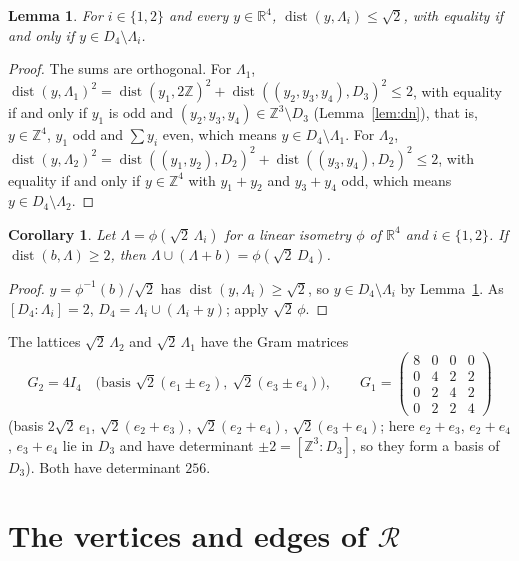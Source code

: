 \documentclass[11pt]{amsart}
\newtheorem{lemma}[theorem]{Lemma}
\newtheorem{corollary}[theorem]{Corollary}
\theoremstyle{definition}
\theoremstyle{remark}
\numberwithin{equation}{section}
\numberwithin{table}{section}
\numberwithin{figure}{section}
\newcommand{\R}{\mathbb{R}}
\newcommand{\Z}{\mathbb{Z}}
\newcommand{\Rk}{\mathcal{R}}
\newcommand{\dist}{\operatorname{dist}}
\begin{document}
\begin{lemma}\label{lem:d4}
For $i\in\{1,2\}$ and every $y\in\R^4$, $\dist(y,\Lambda_i)\le\sqrt2$, with equality if and only if $y\in D_4\setminus\Lambda_i$.
\end{lemma}

\begin{proof}
The sums are orthogonal. For $\Lambda_1$, $\dist(y,\Lambda_1)^2=\dist(y_1,2\Z)^2+\dist((y_2,y_3,y_4),D_3)^2\le2$, with equality if and only if $y_1$ is odd and $(y_2,y_3,y_4)\in\Z^3\setminus D_3$ (Lemma~\ref{lem:dn}), that is, $y\in\Z^4$, $y_1$ odd and $\sum y_i$ even, which means $y\in D_4\setminus\Lambda_1$. For $\Lambda_2$, $\dist(y,\Lambda_2)^2=\dist((y_1,y_2),D_2)^2+\dist((y_3,y_4),D_2)^2\le2$, with equality if and only if $y\in\Z^4$ with $y_1+y_2$ and $y_3+y_4$ odd, which means $y\in D_4\setminus\Lambda_2$.
\end{proof}

\begin{corollary}\label{cor:d4}
Let $\Lambda=\phi(\sqrt2\,\Lambda_i)$ for a linear isometry $\phi$ of $\R^4$ and $i\in\{1,2\}$. If $\dist(b,\Lambda)\ge2$, then $\Lambda\cup(\Lambda+b)=\phi(\sqrt2\,D_4)$.
\end{corollary}

\begin{proof}
$y=\phi^{-1}(b)/\sqrt2$ has $\dist(y,\Lambda_i)\ge\sqrt2$, so $y\in D_4\setminus\Lambda_i$ by Lemma~\ref{lem:d4}. As $[D_4:\Lambda_i]=2$, $D_4=\Lambda_i\cup(\Lambda_i+y)$; apply $\sqrt2\,\phi$.
\end{proof}

The lattices $\sqrt2\,\Lambda_2$ and $\sqrt2\,\Lambda_1$ have the Gram matrices
\begin{equation}\label{eq:grams}
G_2=4I_4\quad\text{(basis }\sqrt2(e_1\pm e_2),\ \sqrt2(e_3\pm e_4)\text{)},\qquad
G_1=\begin{pmatrix}8&0&0&0\\0&4&2&2\\0&2&4&2\\0&2&2&4\end{pmatrix}
\end{equation}
(basis $2\sqrt2\,e_1$, $\sqrt2(e_2+e_3)$, $\sqrt2(e_2+e_4)$, $\sqrt2(e_3+e_4)$; here $e_2+e_3$, $e_2+e_4$, $e_3+e_4$ lie in $D_3$ and have determinant $\pm2=[\Z^3:D_3]$, so they form a basis of $D_3$). Both have determinant $256$.

\section{The vertices and edges of \texorpdfstring{$\Rk$}{R}}\label{sec:computation}
\end{document}
